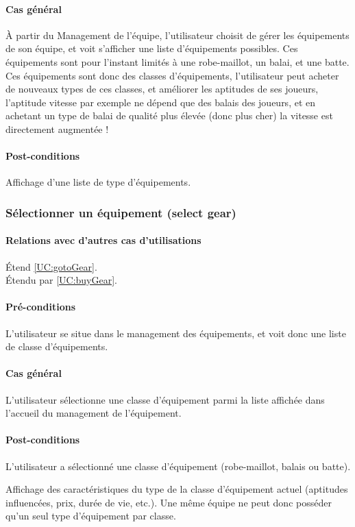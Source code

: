 \paragraph{Cas général}
À partir du Management de l'équipe, l'utilisateur choisit de gérer les équipements de son équipe, et voit s'afficher une liste d'équipements possibles. Ces équipements sont pour l'instant limités à une robe-maillot, un balai, et une batte. Ces équipements sont donc des classes d'équipements, l'utilisateur peut acheter de nouveaux types de ces classes, et améliorer les aptitudes de ses joueurs, l'aptitude vitesse par exemple ne dépend que des balais des joueurs, et en achetant un type de balai de qualité plus élevée (donc plus cher) la vitesse est directement augmentée !
\paragraph{Post-conditions}
\begin{list}{}{\leftmargin=1.5em}
\item{Affichage d'une liste de type d'équipements.}
\end{list}

 \subsubsection{Sélectionner un équipement (select gear)}
\label{UC:selectGear}
\paragraph{Relations avec d'autres cas d'utilisations}
Étend \ref{UC:gotoGear}.\\
Étendu par \ref{UC:buyGear}.
\paragraph{Pré-conditions}
\begin{list}{}{\leftmargin=1.5em}
\item{L'utilisateur se situe dans le management des équipements, et voit donc une liste de classe d'équipements.}
\end{list}
\paragraph{Cas général}
L'utilisateur sélectionne une classe d'équipement parmi la liste affichée dans l'accueil du management de l'équipement.
\paragraph{Post-conditions}
\begin{list}{}{\leftmargin=1.5em}
\item{L'utilisateur a sélectionné une classe d'équipement (robe-maillot, balais ou batte).}
\item{Affichage des caractéristiques du type de la classe d'équipement actuel (aptitudes influencées, prix, durée de vie, etc.). Une même équipe ne peut donc posséder qu'un seul type d'équipement par classe.}
\end{list}

